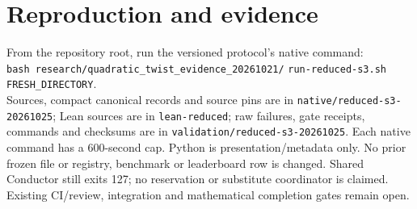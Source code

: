 \documentclass[10pt]{article}
\begin{document}
\section*{Reproduction and evidence}
From the repository root, run the versioned protocol's native command:\\
\texttt{bash research/quadratic\_twist\_evidence\_20261021/}\newline
\texttt{run-reduced-s3.sh FRESH\_DIRECTORY}.\\
Sources, compact canonical records and source pins are in
\texttt{native/reduced-s3-20261025}; Lean sources are in
\texttt{lean-reduced}; raw failures, gate receipts, commands and checksums are
in \texttt{validation/reduced-s3-20261025}. Each native command has a 600-second
cap. Python is presentation/metadata only. No prior frozen file or registry,
benchmark or leaderboard row is changed. Shared Conductor still exits 127;
no reservation or substitute coordinator is claimed. Existing CI/review,
integration and mathematical completion gates remain open.
\end{document}
